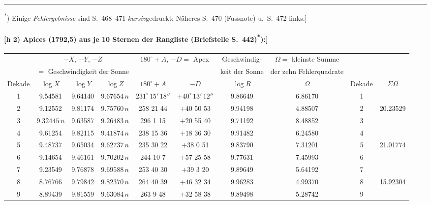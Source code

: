 \documentclass[12pt,a4paper]{article}
\theoremstyle{plain}
\theoremstyle{definition}
\theoremstyle{remark}
\begin{document}
\medskip
\noindent\rule{\textwidth}{0.4pt}
\begin{footnotesize}
\textsuperscript{*}) Einige \textit{Fehlergebnisse} sind S.~468--471 \textit{kursiv}gedruckt; N\"aheres
S.~470 (Fussnote) u.~S.~472 links.]
\end{footnotesize}

\newpage
\paragraph*{[h 2) Apices (1792,5) aus je 10 Sternen der Rangliste (Briefstelle S.~442)\textsuperscript{*}):]}

\begin{small}
\begin{center}
\begin{tabular}{|c||c|c|c||c|c||c||c||c|c|}
\hline
& \multicolumn{3}{c||}{$-X$, $-Y$, $-Z$} &
\multicolumn{2}{c||}{$180^{\circ}+A$, $-D =$ Apex} &
Geschwindig- &
$\Omega =$ kleinste Summe \\
& \multicolumn{3}{c||}{$=$ Geschwindigkeit der Sonne} & & &
keit der Sonne & der zehn Fehlerquadrate \\
\hline
Dekade & $\log X$ & $\log Y$ & $\log Z$ & $180^{\circ}+A$ & $-D$ &
$\log R$ & $\Omega$ & Dekade & $\Sigma\Omega$ \\
\hline
 1 & 9.54581 & 9.64140 & $9.67654\,n$ & $231^{\circ}\,15'\,18''$ & $+40^{\circ}\,13'\,12''$ & 9.86649 & 6.86170 & 1 & \\
 2 & 9.12552 & 9.81174 & $9.75760\,n$ & 258 21 44 & $+40$ 50 53 & 9.94198 & 4.88507 & 2 & 20.23529 \\
 3 & $9.32445\,n$ & 9.63587 & $9.26483\,n$ & 296 \phantom{0}1 15 & $+20$ 55 40 & 9.71192 & 8.48852 & 3 & \\
 4 & 9.61254 & 9.82115 & $9.41874\,n$ & 238 15 36 & $+18$ 36 30 & 9.91482 & 6.24580 & 4 & \\
 5 & 9.48737 & 9.65034 & $9.62737\,n$ & 235 30 22 & $+38$ \phantom{0}0 51 & 9.83790 & 7.31201 & 5 & 21.01774 \\
 6 & 9.14654 & 9.46161 & $9.70202\,n$ & 244 10 \phantom{0}7 & $+57$ 25 58 & 9.77631 & 7.45993 & 6 & \\
\hline
 7 & 9.23549 & 9.76878 & $9.69588\,n$ & 253 40 30 & $+39$ \phantom{0}3 20 & 9.89649 & 5.64192 & 7 & \\
 8 & 8.76766 & 9.79842 & $9.82370\,n$ & 264 40 39 & $+46$ 32 34 & 9.96283 & 4.99370 & 8 & 15.92304 \\
 9 & 8.89439 & 9.81559 & $9.63084\,n$ & 263 \phantom{0}9 48 & $+32$ 58 38 & 9.89498 & 5.28742 & 9 & \\

\end{tabular}
\end{center}
\end{small}
\end{document}
